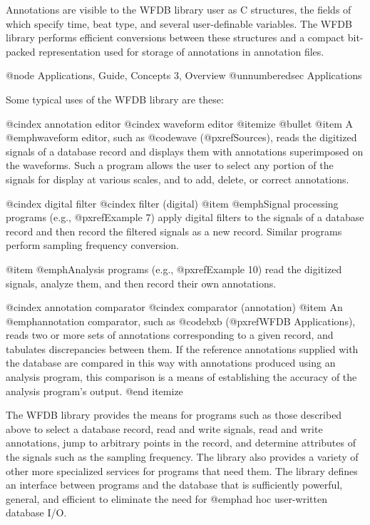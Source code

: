 Annotations are visible to the WFDB library user as C structures, the
fields of which specify time, beat type, and several user-definable
variables.  The WFDB library performs efficient conversions between these
structures and a compact bit-packed representation used for storage of
annotations in annotation files.

@node     Applications, Guide, Concepts 3, Overview
@unnumberedsec Applications

Some typical uses of the WFDB library are these:

@cindex annotation editor
@cindex waveform editor
@itemize @bullet
@item
A @emph{waveform editor}, such as @code{wave} (@pxref{Sources}), reads the
digitized signals of a database record and displays them with
annotations superimposed on the waveforms.  Such a program allows the
user to select any portion of the signals for display at various scales,
and to add, delete, or correct annotations.

@cindex digital filter
@cindex filter (digital)
@item
@emph{Signal processing programs} (e.g., @pxref{Example 7}) apply digital
filters to the signals of a database record and then record the filtered
signals as a new record.  Similar programs perform sampling frequency
conversion.

@item
@emph{Analysis programs} (e.g., @pxref{Example 10}) read the digitized
signals, analyze them, and then record their own annotations.

@cindex annotation comparator
@cindex comparator (annotation)
@item
An @emph{annotation comparator}, such as @code{bxb}
(@pxref{WFDB Applications}), reads two or more sets of annotations
corresponding to a given record, and tabulates discrepancies between
them.  If the reference annotations supplied with the database are
compared in this way with annotations produced using an analysis
program, this comparison is a means of establishing the accuracy of the
analysis program's output.
@end itemize

The WFDB library provides the means for programs such as those described
above to select a database record, read and write signals, read and
write annotations, jump to arbitrary points in the record, and determine
attributes of the signals such as the sampling frequency.  The library
also provides a variety of other more specialized services for programs
that need them.  The library defines an interface between programs and
the database that is sufficiently powerful, general, and efficient to
eliminate the need for @emph{ad hoc} user-written database I/O.

